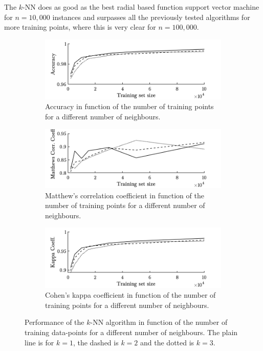 The $k$-NN does as good as the best radial based function support vector machine for $n=10,000$ instances and surpasses all the previously tested algorithms for more training points, where this is very clear for $n=100,000$.

\begin{figure}[ht!]
        \begin{subfigure}[b]{.97\textwidth}  
            \centering 
            \includegraphics[width=.98\textwidth]{parts/chap-4/img-knn/knn-acc.png}
            \caption{Accuracy in function of the number of training points for a different number of neighbours.}
        \end{subfigure}
        \vfill
        \begin{subfigure}[b]{.97\textwidth}  
            \centering 
            \includegraphics[width=.98\textwidth]{parts/chap-4/img-knn/knn-mcc.png}
            \caption{Matthew's correlation coefficient in function of the number of training points for a different number of neighbours.} 
        \end{subfigure}
        \vfill
        \begin{subfigure}[b]{.97\textwidth}  
            \centering 
            \includegraphics[width=.98\textwidth]{parts/chap-4/img-knn/knn-kappa.png}
            \caption{Cohen's kappa coefficient in function of the number of training points for a different number of neighbours.} 
        \end{subfigure}
        \vfill
        \caption{Performance of the $k$-NN algorithm in function of the number of training data-points for a different number of neighbours. The plain line is for $k=1$, the dashed is $k=2$ and the dotted is $k=3$.}
        \label{fig:knn}
\end{figure}

